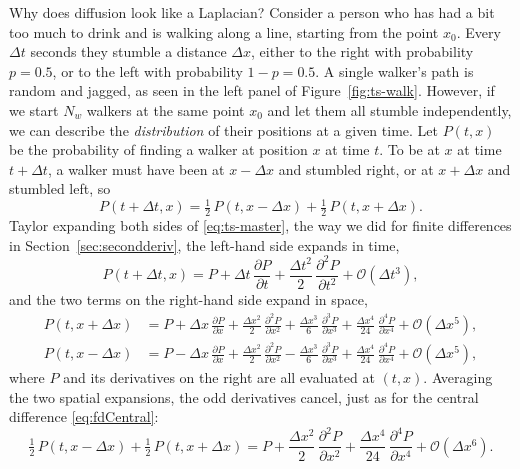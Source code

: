 Why does diffusion look like a Laplacian? Consider a person who has had a bit
too much to drink and is walking along a line, starting from the point $x_0$.
Every $\Delta t$ seconds they stumble a distance $\Delta x$, either to the right
with probability $p = 0.5$, or to the left with probability $1-p = 0.5$. A single walker's
path is random and jagged, as seen in the left panel of Figure~\ref{fig:ts-walk}. However, if we start $N_w$ walkers at
the same point $x_0$ and let them all stumble independently, we can describe the
\emph{distribution} of their positions at a given time. Let $P(t,x)$ be the
probability of finding a walker at position $x$ at time $t$. To be at $x$ at
time $t + \Delta t$, a walker must have been at $x - \Delta x$ and stumbled
right, or at $x + \Delta x$ and stumbled left, so
\begin{equation}
  P(t + \Delta t, x) = \tfrac12\,P(t, x - \Delta x) + \tfrac12\,P(t, x + \Delta x).
  \label{eq:ts-master}
\end{equation}
Taylor expanding both sides of \eqref{eq:ts-master}, the way we did for finite
differences in Section~\ref{sec:secondderiv}, the left-hand side expands in time,
\begin{equation*}
  P(t + \Delta t, x) = P + \Delta t\,\frac{\partial P}{\partial t}
  + \frac{\Delta t^2}{2}\,\frac{\partial^2 P}{\partial t^2}
  + \mathcal{O}(\Delta t^3),
\end{equation*}
and the two terms on the right-hand side expand in space,
\begin{align*}
  P(t, x + \Delta x) &= P + \Delta x\,\frac{\partial P}{\partial x}
  + \frac{\Delta x^2}{2}\,\frac{\partial^2 P}{\partial x^2}
  + \frac{\Delta x^3}{6}\,\frac{\partial^3 P}{\partial x^3}
  + \frac{\Delta x^4}{24}\,\frac{\partial^4 P}{\partial x^4}
  + \mathcal{O}(\Delta x^5), \\
  P(t, x - \Delta x) &= P - \Delta x\,\frac{\partial P}{\partial x}
  + \frac{\Delta x^2}{2}\,\frac{\partial^2 P}{\partial x^2}
  - \frac{\Delta x^3}{6}\,\frac{\partial^3 P}{\partial x^3}
  + \frac{\Delta x^4}{24}\,\frac{\partial^4 P}{\partial x^4}
  + \mathcal{O}(\Delta x^5),
\end{align*}
where $P$ and its derivatives on the right are all evaluated at $(t,x)$. Averaging
the two spatial expansions, the odd derivatives cancel, just as for the central
difference \eqref{eq:fdCentral}:
\begin{equation*}
  \tfrac12\,P(t, x - \Delta x) + \tfrac12\,P(t, x + \Delta x)
  = P + \frac{\Delta x^2}{2}\,\frac{\partial^2 P}{\partial x^2}
  + \frac{\Delta x^4}{24}\,\frac{\partial^4 P}{\partial x^4}
  + \mathcal{O}(\Delta x^6).
\end{equation*}
